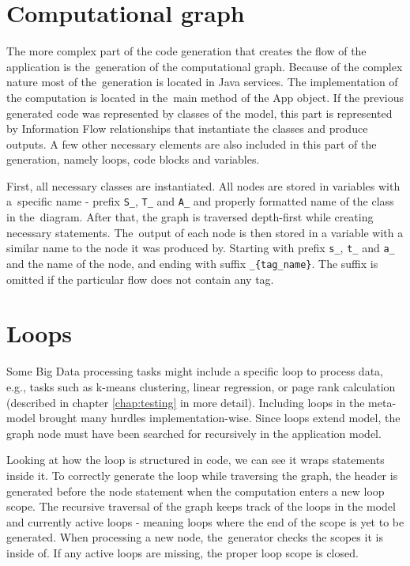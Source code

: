 \section{Computational graph}

The more complex part of the code generation that creates the flow of the application is the~generation of the computational graph. Because of the complex nature most of the~generation is located in Java services. The implementation of the computation is located in the~main method of the App object. If the previous generated code was represented by classes of the model, this part is represented by Information Flow relationships that instantiate the classes and produce outputs. A few other necessary elements are also included in this part of the generation, namely loops, code blocks and variables. 

First, all necessary classes are instantiated. All nodes are stored in variables with a~specific name - prefix \texttt{S\_}, \texttt{T\_} and \texttt{A\_} and properly formatted name of the class in the~diagram. 
After that, the graph is traversed depth-first while creating necessary statements. The~output of each node is then stored in a variable with a similar name to the node it was produced by. Starting with prefix \texttt{s\_}, \texttt{t\_} and \texttt{a\_} and the name of the node, and ending with suffix \texttt{\_\{tag\_name\}}. The suffix is omitted if the particular flow does not contain any tag. 

\section{Loops}

Some Big Data processing tasks might include a specific loop to process data, e.g., tasks such as k-means clustering, linear regression, or page rank calculation (described in chapter \ref{chap:testing} in more detail). Including loops in the meta-model brought many hurdles implementation-wise. Since loops extend model, the graph node must have been searched for recursively in the application model. 

Looking at how the loop is structured in code, we can see it wraps statements inside it. To correctly generate the loop while traversing the graph, the header is generated before the node statement when the computation enters a new loop scope. The recursive traversal of the graph keeps track of the loops in the model and currently active loops - meaning loops where the end of the scope is yet to be generated. When processing a new node, the~generator checks the scopes it is inside of. If any active loops are missing, the proper loop scope is closed.

